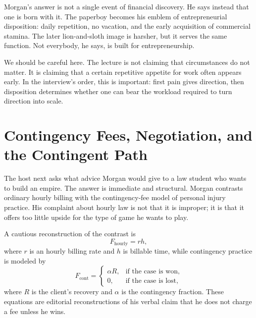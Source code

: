 Morgan's answer is not a single event of financial discovery. He says instead that one is born with it. The paperboy becomes his emblem of entrepreneurial disposition: daily repetition, no vacation, and the early acquisition of commercial stamina. The later lion-and-sloth image is harsher, but it serves the same function. Not everybody, he says, is built for entrepreneurship.

We should be careful here. The lecture is not claiming that circumstances do not matter. It is claiming that a certain repetitive appetite for work often appears early. In the interview's order, this is important: first pain gives direction, then disposition determines whether one can bear the workload required to turn direction into scale.

\section{Contingency Fees, Negotiation, and the Contingent Path}

The host next asks what advice Morgan would give to a law student who wants to build an empire. The answer is immediate and structural. Morgan contrasts ordinary hourly billing with the contingency-fee model of personal injury practice. His complaint about hourly law is not that it is improper; it is that it offers too little upside for the type of game he wants to play.

A cautious reconstruction of the contrast is
\begin{equation}
F_{\mathrm{hourly}} = r h,
\end{equation}
where \(r\) is an hourly billing rate and \(h\) is billable time, while contingency practice is modeled by
\begin{equation}
F_{\mathrm{cont}} =
\begin{cases}
\alpha R, & \text{if the case is won},\\[4pt]
0, & \text{if the case is lost},
\end{cases}
\end{equation}
where \(R\) is the client's recovery and \(\alpha\) is the contingency fraction. These equations are editorial reconstructions of his verbal claim that he does not charge a fee unless he wins.

